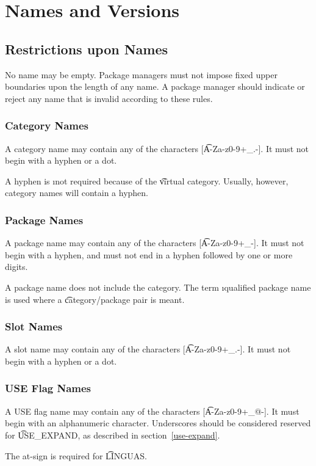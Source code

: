 \chapter{Names and Versions}

\section{Restrictions upon Names}

No name may be empty. Package managers must not impose fixed upper boundaries upon the length of any
name. A package manager should indicate or reject any name that is invalid according to these rules.

\subsection{Category Names}
A category name may contain any of the characters [\t{A-Za-z0-9+\_.-}]. It must not begin with
a hyphen or a dot.

\note A hyphen is \i{not} required because of the \t{virtual} category. Usually, however, category
names will contain a hyphen.

\subsection{Package Names}
A package name may contain any of the characters [\t{A-Za-z0-9+\_-}]. It must not begin with a
hyphen, and must not end in a hyphen followed by one or more digits.

\note A package name does not include the category. The term \i{qualified package name} is used
where a \t{category/package} pair is meant.

\subsection{Slot Names}
\label{slot-names}
A slot name may contain any of the characters [\t{A-Za-z0-9+\_.-}]. It must not begin with a
hyphen or a dot.

\subsection{USE Flag Names}
A USE flag name may contain any of the characters [\t{A-Za-z0-9+\_@-}]. It must begin with an
alphanumeric character. Underscores should be considered reserved for \t{USE\_EXPAND}, as
described in section~\ref{use-expand}.

\note The at-sign is required for \t{LINGUAS}.

